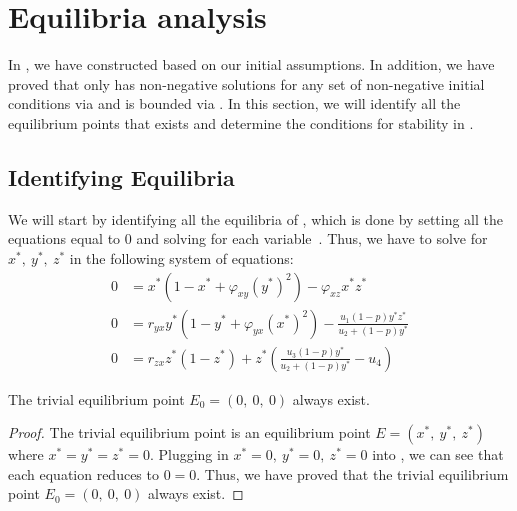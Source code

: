 
\section{Equilibria analysis}\label{sec:equilibria-analysis}
In , we have constructed  based on our initial assumptions. In addition, we have proved that  only has non-negative solutions for any set of non-negative initial conditions via  and is bounded via . In this section, we will identify all the equilibrium points that exists and determine the conditions for stability in .

\subsection{Identifying Equilibria}\label{subsec:identifying-equilibria}
We will start by identifying all the equilibria of , which is done by setting all the equations equal to 0 and solving for each variable~\cite{Strogatz9780813349107}. Thus, we have to solve for $x^*,\ y^*,\ z^*$ in the following system of equations:
\begin{subequations}\label{system:model-0}
    \begin{align}
        0 &= x^*\left(1-x^*+\varphi_{xy}\left(y^*\right)^2\right)-\varphi_{xz}x^*z^* \label{eq:model-0-x}\\
        0 &= r_{yx}y^*\left(1-y^*+\varphi_{yx}\left(x^*\right)^2\right)-\frac{u_1\left(1-p\right)y^*z^*}{u_2+\left(1-p\right)y^*} \label{eq:model-0-y}\\
        0 &= r_{zx}z^*\left(1-z^*\right)+z^*\left(\frac{u_3\left(1-p\right)y^*}{u_2+\left(1-p\right)y^*}-u_4\right) \label{eq:model-0-z}
    \end{align}
\end{subequations}

\begin{theorem}\label{thm:trivial-exist}
    The trivial equilibrium point $E_0=\left(0,\ 0,\ 0\right)$ always exist.
\end{theorem}
\begin{proof}
    The trivial equilibrium point is an equilibrium point $E=\left(x^*,\ y^*,\ z^*\right)$ where $x^*=y^*=z^*=0$. Plugging in $x^*=0,\ y^*=0,\ z^*=0$ into , we can see that each equation reduces to $0=0$. Thus, we have proved that the trivial equilibrium point $E_0=\left(0,\ 0,\ 0\right)$ always exist.
\end{proof}


